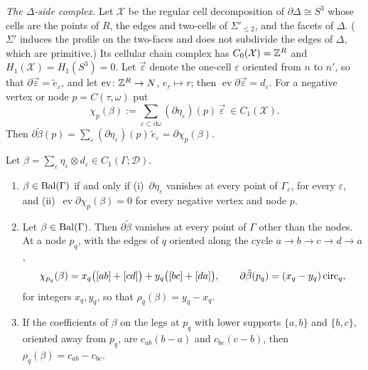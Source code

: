\emph{The $\Delta$-side complex.} Let $\mathcal X$ be the regular cell decomposition of $\partial\Delta\cong S^3$ whose
cells are the points of $R$, the edges and two-cells of $\Sigma'_{\le2}$, and the facets of
$\Delta$. ($\Sigma'$ induces the profile on the two-faces and does not subdivide the edges of $\Delta$, which are
primitive.) Its cellular chain complex has $C_0(\mathcal X)=\mathbb Z^R$ and $H_1(\mathcal X)=H_1(S^3)=0$. Let $\vec\varepsilon$
denote the one-cell $\varepsilon$ oriented from $n$ to $n'$, so that $\partial\vec\varepsilon=\tilde e_\varepsilon$, and let
$\operatorname{ev}\colon\mathbb Z^R\to N$, $e_r\mapsto r$; then $\operatorname{ev}\partial\vec\varepsilon=d_\varepsilon$. For a negative vertex or node
$p=C(\tau,\omega)$ put
\[
\chi_p(\beta):=\sum_{\varepsilon\subset\partial\omega}(\partial\eta_\varepsilon)(p)\,\vec\varepsilon\ \in C_1(\mathcal X).
\]
Then $\partial\tilde\beta(p)=\sum_\varepsilon(\partial\eta_\varepsilon)(p)\,\tilde e_\varepsilon=\partial\chi_p(\beta)$.

\begin{lemma}\label{lem:balanced}
Let $\beta=\sum_\varepsilon\eta_\varepsilon\otimes d_\varepsilon\in C_1(\Gamma;\mathcal D)$.
\begin{enumerate}
\item $\beta\in\mathrm{Bal}(\Gamma)$ if and only if (i)~$\partial\eta_\varepsilon$ vanishes at every point of $\Gamma_\varepsilon$, for every
$\varepsilon$, and (ii)~$\operatorname{ev}\partial\chi_p(\beta)=0$ for every negative vertex and node $p$.
\item Let $\beta\in\mathrm{Bal}(\Gamma)$. Then $\partial\tilde\beta$ vanishes at every point of $\Gamma$ other than the nodes. At a node
$p_q$, with the edges of $q$ oriented along the cycle $a\to b\to c\to d\to a$,
\[
\chi_{p_q}(\beta)=x_q\bigl([ab]+[cd]\bigr)+y_q\bigl([bc]+[da]\bigr),\qquad \partial\tilde\beta(p_q)=(x_q-y_q)\,\mathrm{circ}_q,
\]
for integers $x_q,y_q$, so that $\rho_q(\beta)=y_q-x_q$.
\item If the coefficients of $\beta$ on the legs at $p_q$ with lower supports $\{a,b\}$ and $\{b,c\}$, oriented away from
$p_q$, are $c_{ab}(b-a)$ and $c_{bc}(c-b)$, then $\rho_q(\beta)=c_{ab}-c_{bc}$.
\end{enumerate}
\end{lemma}

